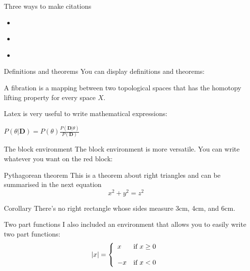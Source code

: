 \begin{frame}{Three ways to make citations}
	\begin{itemize}
	\item \cite{kass1995}
	\item \citep{kass1995}
	\item \citet{kass1995}
	\end{itemize}
\end{frame}

\begin{frame}{Definitions and theorems}
	You can display definitions and theorems:
	\begin{definition}[Fibration]
	A fibration is a mapping between two topological spaces that has the homotopy lifting property for every space $X$.
	\end{definition}
	Latex is very useful to write mathematical expressions:
	\begin{theorem}[Bayes]
	$P(\theta|\textbf{D}) = P(\theta ) \frac{P(\textbf{D} |\theta)}{P(\textbf{D})}$
	\end{theorem}
\end{frame}

\begin{frame}{The block environment}
	The block environment is more versatile. You can write whatever you want on the red block:
	\begin{block}{Pythagorean theorem}
	This is a theorem about right triangles and can be summarised in the next 
	equation 
	\[ x^2 + y^2 = z^2 \]
	\end{block}
	\begin{block}{Corollary}
	There's no right rectangle whose sides measure 3cm, 4cm, and 6cm.
	\end{block}
\end{frame}

\begin{frame}{Two part functions}
	I also included an environment that allows you to easily write two part functions:
	$$|x| =\left\{ \begin{array}{ll} x & \mbox{if } x \geq 0 \\ \\ -x & \mbox{if } x < 0 \end{array} \right.$$
\end{frame}

